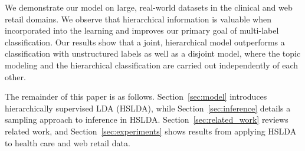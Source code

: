 We demonstrate our model on large, real-world datasets in the clinical and web
retail domains. We observe that hierarchical information is valuable when
incorporated into the learning and improves our primary goal of multi-label
classification. Our results show that a joint, hierarchical model outperforms a
classification with unstructured labels as well as a disjoint model, where the
topic modeling and the hierarchical classification are carried out
independently of each other. 

The remainder of this paper is as follows. Section~\ref{sec:model}
introduces hierarchically supervised LDA (HSLDA), while
Section~\ref{sec:inference} details a sampling approach to inference in HSLDA. 
Section~\ref{sec:related_work} reviews related work, and
Section~\ref{sec:experiments} shows results from applying HSLDA to health care
and web retail data.  





